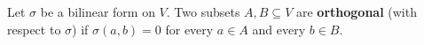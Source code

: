Let $\sigma$ be a bilinear form on $V$. Two subsets $A, B \subseteq V$ are \textbf{orthogonal} (with respect to $\sigma$) if $\sigma(a, b) = 0$ for every $a \in A$ and every $b \in B$.
